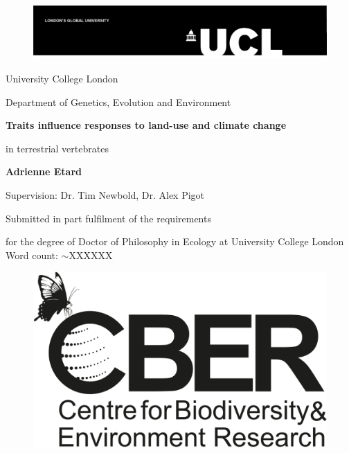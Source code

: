 \date{\today}

\begin{titlepage}

\begin{figure}
{\includegraphics[scale=0.8]{UCL_logo}}
\end{figure}

\begin{center}

{\Large
University College London\par
Department of Genetics, Evolution and Environment\par
}
%
\vskip 3.5cm
%
{\huge \bf
Traits influence responses to land-use and climate change\par in terrestrial vertebrates\par
}
%
\vskip 2cm
%
{\Large
\textbf{Adrienne Etard}\par
\vskip 1cm
Supervision: Dr. Tim Newbold, Dr. Alex Pigot

\vskip 1cm

\makeatletter
\@date
\vskip 0.5cm
\par
Submitted in part fulfilment of the requirements \par 
for the degree of Doctor of Philosophy in Ecology at University College London
\vskip 0.5cm
 Word count: $\sim$XXXXXX
\vskip 1cm
}
\end{center}
\begin{figure}[h!]
\centering
{\includegraphics[scale=0.09]{cber_logo}}
\end{figure}
\end{titlepage}

\makeatother